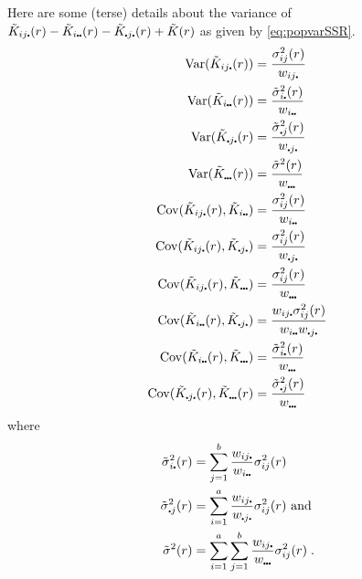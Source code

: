 \documentclass[12pt]{article}
\newcommand{\pt}{\mbox{\scalebox{0.4}{$\bullet$}}}
\newcommand{\Cov}{\mbox{$\textup{\textrm{Cov}}$}}
\newcommand{\Var}{\mbox{$\textup{\textrm{Var}}$}}
\newcommand{\tilsig}{\mbox{$\tilde{\sigma}$}}
\begin{document}
Here are some (terse) details about the variance of
\mbox{$\tilde{K}_{ij \pt}(r) - \tilde{K}_{i \pt \pt}(r)
- \tilde{K}_{\pt j \pt}(r) + \tilde{K}(r)$} as given by
\eqref{eq:popvarSSR}.
\begin{align*}
\Var(\tilde{K}_{ij \pt}(r))      &= \frac{\sigma_{ij}^2(r)}{w_{i j \pt}} \\
\Var(\tilde{K}_{i \pt \pt}(r))   &= \frac{\tilsig_{i\pt}^2(r)}{w_{i \pt \pt}} \\
\Var(\tilde{K}_{\pt j \pt}(r)    &= \frac{\tilsig_{\pt j}^2(r)}{w_{\pt j \pt}} \\
\Var(\tilde{K}_{\pt \pt \pt}(r)) &= \frac{\tilsig^2(r)}{w_{\pt \pt \pt}} \\
\Cov(\tilde{K}_{ij \pt}(r),\tilde{K}_{i \pt \pt})
                                 &= \frac{\sigma_{ij}^2(r)}{w_{i \pt \pt}} \\
\Cov(\tilde{K}_{ij \pt}(r),\tilde{K}_{\pt j \pt})
                                 &= \frac{\sigma_{ij}^2(r)}{w_{\pt j \pt}} \\
\Cov(\tilde{K}_{ij \pt}(r),\tilde{K}_{\pt \pt \pt})
                                 &= \frac{\sigma_{ij}^2(r)}{w_{\pt \pt \pt}} \\
\Cov(\tilde{K}_{i \pt \pt}(r),\tilde{K}_{\pt j \pt})
                                 &= \frac{w_{i j \pt} \sigma_{ij}^2(r)}{w_{i \pt \pt}
                                                             w_{\pt j \pt}} \\
\Cov(\tilde{K}_{i \pt \pt}(r),\tilde{K}_{\pt \pt \pt})
                                 &= \frac{\tilsig_{i \pt}^2(r)}{w_{\pt \pt \pt}} \\
\Cov(\tilde{K}_{\pt j \pt}(r),\tilde{K}_{\pt \pt \pt}(r)
                                 &= \frac{\tilsig_{\pt j}^2(r)}{w_{\pt \pt \pt}}
\end{align*}
where
\begin{equation}
\label{eq:popvars}
\begin{split}
\tilsig_{i \pt}^2(r) &= \sum_{j=1}^b \frac{w_{ij \pt}}{w_{i \pt \pt}} \sigma^2_{ij}(r) \\
\tilsig_{\pt j}^2(r) &= \sum_{i=1}^a \frac{w_{ij \pt}}{w_{\pt j \pt}} \sigma^2_{ij}(r)
                        \mbox{~and}\\
\tilsig^2(r) &= \sum_{i=1}^a \sum_{j=1}^b \frac{w_{i j \pt}}{w_{\pt \pt \pt}}
                                          \sigma^2_{ij}(r) \; .
\end{split}
\end{equation}
\end{document}
